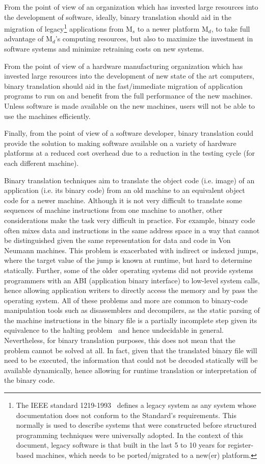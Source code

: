 From the point of view of an organization which has invested large 
resources into the development of software, ideally, binary translation 
should aid in the migration of legacy\footnote{ 
The IEEE standard 1219-1993~\cite{Iee93} defines a legacy system as any 
system whose documentation does not conform to the Standard's requirements.
This normally is used to describe systems that were constructed before 
structured programming techniques were universally adopted.  In the 
context of this document, legacy software is that built in the last 5 to 10 
years for register-based machines, which needs to be ported/migrated to 
a new(er) platform. 
} applications from M$_s$ to a newer platform M$_d$, to take 
full advantage of M$_d$'s computing resources, but also to maximize the
investment in software systems and minimize retraining costs on new
systems.

From the point of view of a hardware manufacturing organization 
which has invested large resources into the development of new 
state of the art computers, binary translation should aid in the
fast/immediate migration of application programs to run on and benefit 
from the full performance of the new machines.  Unless software is made
available on the new machines, users will not be able to use the
machines efficiently.  

Finally, from the point of view of a software developer, binary
translation could provide the solution to making software available
on a variety of hardware platforms at a reduced cost overhead due
to a reduction in the testing cycle (for each different machine). 
 
Binary translation techniques aim to translate the object code (i.e. image) 
of an application (i.e. its binary code) from an old machine to an
equivalent object code for a newer machine.  Although it is not very
difficult to translate some sequences of machine instructions from 
one machine to another, other considerations make the task very difficult 
in practice.  
For example, binary code often mixes data and instructions in the same 
address space in a way that cannot be distinguished given the same
representation for data and code in Von Neumann machines.  
This problem is exacerbated with indirect or indexed jumps, where
the target value of the jump is known at runtime, but hard to determine
statically. 
Further, some of the older operating systems did not provide systems
programmers with an ABI (application binary interface) to low-level
system calls, hence allowing application writers to directly access
the memory and by pass the operating system.  
All of these problems and more are common to binary-code manipulation
tools such as disassemblers and decompilers, as the static parsing of
the machine instructions in the binary file is a partially incomplete
step given its equivalence to the halting problem~\cite{Hors79} and 
hence undecidable in general.
Nevertheless, for binary translation purposes, this does not mean
that the problem cannot be solved at all.  In fact, given that the
translated binary file will need to be executed, the information 
that could not be decoded statically will be available dynamically,
hence allowing for runtime translation or interpretation of the 
binary code. 
 
